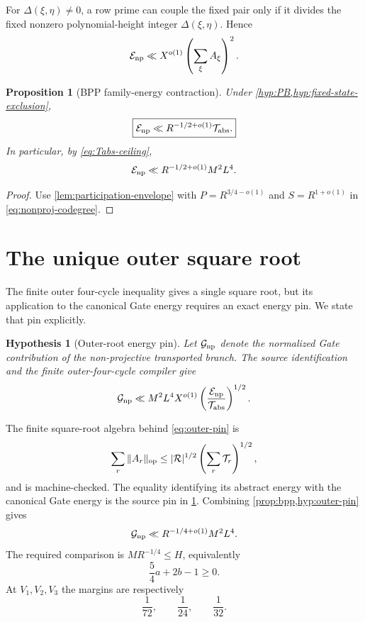 \documentclass[11pt]{article}
\newtheorem{proposition}[proposition]{Proposition}
\newtheorem{hypothesis}[hypothesis]{Hypothesis}
\theoremstyle{definition}
\newcommand{\1}{\mathbf 1}
\begin{document}
For $\Delta(\xi,\eta)\ne0$, a row prime can couple the fixed pair only if it
divides the fixed nonzero polynomial-height integer $\Delta(\xi,\eta)$.  Hence
\begin{equation}
   \mathcal E_{\rm np}
   \ll X^{o(1)}\left(\sum_{\xi}A_{\xi}\right)^2.
   \label{eq:nonproj-codegree}
\end{equation}

\begin{proposition}[BPP family-energy contraction]
\label{prop:bpp}
Under \cref{hyp:PB,hyp:fixed-state-exclusion},
\[
   \boxed{\mathcal E_{\rm np}
          \ll R^{-1/2+o(1)}\mathcal T_{\rm abs}.}
\]
In particular, by \eqref{eq:Tabs-ceiling},
\[
   \mathcal E_{\rm np}
   \ll R^{-1/2+o(1)}M^2L^4.
\]
\end{proposition}
\begin{proof}
Use \cref{lem:participation-envelope} with
$P=R^{3/4-o(1)}$ and $S=R^{1+o(1)}$ in
\eqref{eq:nonproj-codegree}.
\end{proof}

\section{The unique outer square root}
\label{sec:root}
The finite outer four-cycle inequality gives a single square root, but its
application to the canonical Gate energy requires an exact energy pin.  We
state that pin explicitly.

\begin{hypothesis}[Outer-root energy pin]
\label{hyp:outer-pin}
Let $\mathcal G_{\rm np}$ denote the normalized Gate contribution of the
non-projective transported branch.  The source identification and the finite
outer-four-cycle compiler give
\begin{equation}
   \mathcal G_{\rm np}
   \ll M^2L^4X^{o(1)}
      \left(\frac{\mathcal E_{\rm np}}{\mathcal T_{\rm abs}}\right)^{1/2}.
   \label{eq:outer-pin}
\end{equation}
\end{hypothesis}

The finite square-root algebra behind \eqref{eq:outer-pin} is
\[
 \sum_r\|A_r\|_{\rm op}
 \le |\mathcal R|^{1/2}\left(\sum_r\mathcal T_r\right)^{1/2},
\]
and is machine-checked.  The equality identifying its abstract energy with
the canonical Gate energy is the source pin in \cref{hyp:outer-pin}.
Combining \cref{prop:bpp,hyp:outer-pin} gives
\[
   \mathcal G_{\rm np}
   \ll R^{-1/4+o(1)}M^2L^4.
\]
The required comparison is $MR^{-1/4}\le H$, equivalently
\[
   \frac54a+2b-1\ge0.
\]
At $V_1,V_2,V_3$ the margins are respectively
\[
   \frac1{72},\qquad\frac1{24},\qquad\frac1{32}.
\]
\end{document}
